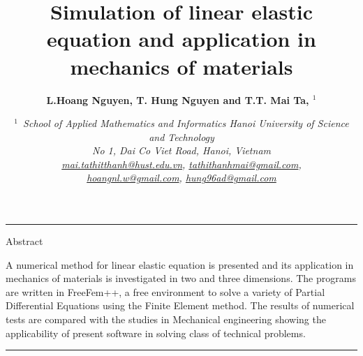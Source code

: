 \documentclass[notitlepage,a4paper,fleqn,9pt]{icmfarticle}
\title{\bf 
  Simulation of linear elastic equation and application in mechanics of materials
}
\author{\normalsize\bf
L.Hoang Nguyen, T. Hung Nguyen and T.T. Mai Ta, $^1$
}
\date{\normalsize\vspace{-2ex}\em
$^1$~School of Applied Mathematics and Informatics
Hanoi University of Science and Technology\\
No 1, Dai Co Viet Road, Hanoi, Vietnam\\
\href{mailto:mai.tathitthanh@hust.edu.vn}{mai.tathitthanh@hust.edu.vn},
\href{mailto:tathithanhmai@gmail.com}{tathithanhmai@gmail.com},
\\[1.1mm]
\href{mailto:hoangnl.w@gmail.com}{hoangnl.w@gmail.com},
\href{mailto:hung96ad@gmail.com}{hung96ad@gmail.com}
}
\begin{document}
\raggedcolumns

\maketitle
\vspace{-3mm}
\noindent\rule{\textwidth}{.1pt}

\noindent
Abstract\\
\vspace{1ex}

\noindent
A numerical method for linear elastic equation is presented and its application in mechanics of materials is investigated in two and three dimensions. The programs are written in FreeFem++, a free environment to solve a variety of Partial Differential Equations using the Finite Element method. The results of numerical tests are compared with the studies in Mechanical engineering showing the applicability of present software in solving class of technical problems. \\

\vspace{1ex}


\noindent\rule{\textwidth}{.1pt}\vspace{2mm}
\end{document}
